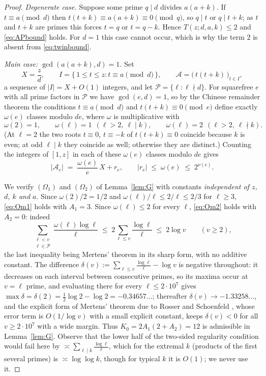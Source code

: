 \documentclass[10pt]{article}
\theoremstyle{definition}
\theoremstyle{remark}
\begin{document}
\begin{proof}
\emph{Degenerate case.} Suppose some prime $q \mid d$ divides $a(a+k)$. If
$t \equiv a \pmod d$ then $t(t+k) \equiv a(a+k) \equiv 0 \pmod q$, so $q \mid
t$ or $q \mid t+k$; as $t$ and $t+k$ are primes this forces $t = q$ or
$t = q-k$. Hence $T(z;d,a,k) \le 2$ and \eqref{eq:APbound} holds. For $d = 1$
this case cannot occur, which is why the term $2$ is absent from
\eqref{eq:twinbound}.

\emph{Main case: $\gcd(a(a+k), d) = 1$.} Set
\[
  X = \frac{z}{d}, \qquad
  I = \{\, 1 \le t \le z : t \equiv a \!\!\pmod d \,\}, \qquad
  \mathcal{A} = \bigl(\, t(t+k) \,\bigr)_{t \in I},
\]
a sequence of $|I| = X + O(1)$ integers, and let
$\mathcal{P} = \{\ell : \ell \nmid d\}$. For squarefree $e$ with all prime
factors in $\mathcal{P}$ we have $\gcd(e,d) = 1$, so by the Chinese remainder
theorem the conditions $t \equiv a \pmod d$ and $t(t+k) \equiv 0 \pmod e$
define exactly $\omega(e)$ classes modulo $de$, where $\omega$ is
multiplicative with
\[
  \omega(2) = 1, \qquad
  \omega(\ell) = 1 \ \ (\ell > 2,\ \ell \mid k), \qquad
  \omega(\ell) = 2 \ \ (\ell > 2,\ \ell \nmid k).
\]
(At $\ell = 2$ the two roots $t \equiv 0$, $t \equiv -k$ of $t(t+k) \equiv 0$
coincide because $k$ is even; at odd $\ell \mid k$ they coincide as well;
otherwise they are distinct.) Counting the integers of $[1,z]$ in each of
these $\omega(e)$ classes modulo $de$ gives
\[
  |\mathcal{A}_e| \;=\; \frac{\omega(e)}{e}\,X + r_e,
  \qquad |r_e| \;\le\; \omega(e) \;\le\; 2^{\nu(e)} .
\]

We verify $(\Omega_1)$ and $(\Omega_2)$ of Lemma~\ref{lem:G} with constants
\emph{independent of $z$, $d$, $k$ and $a$}. Since $\omega(2)/2 = 1/2$ and
$\omega(\ell)/\ell \le 2/\ell \le 2/3$ for $\ell \ge 3$, \eqref{eq:Om1} holds
with $A_1 = 3$. Since $\omega(\ell) \le 2$ for every $\ell$, \eqref{eq:Om2}
holds with $A_2 = 0$: indeed
\[
  \sum_{\substack{\ell < v \\ \ell \in \mathcal{P}}}
    \frac{\omega(\ell)\log\ell}{\ell}
  \;\le\; 2\sum_{\ell \le v}\frac{\log\ell}{\ell}
  \;\le\; 2\log v \qquad (v \ge 2),
\]
the last inequality being Mertens' theorem in its sharp form, with no additive
constant. The difference $\delta(v) := \sum_{\ell\le v}\frac{\log\ell}{\ell} -
\log v$ is negative throughout: it decreases on each interval between
consecutive primes, so its maxima occur at $v = \ell$ prime, and evaluating
there for every $\ell \le 2\cdot10^{7}$ gives $\max\delta = \delta(2) =
\tfrac12\log 2 - \log 2 = -0.34657\ldots$; thereafter $\delta(v) \to
-1.33258\ldots$, and the explicit form of Mertens' theorem due to Rosser and
Schoenfeld \cite{RS}, whose error term is $O(1/\log v)$ with a small explicit
constant, keeps $\delta(v) < 0$ for all $v \ge 2\cdot10^{7}$ with a wide
margin. Thus $K_0 = 2A_1(2+A_2) = 12$ is admissible in
Lemma~\ref{lem:G}. Observe that the lower half of the two-sided regularity
condition would fail here by $\asymp \sum_{\ell \mid k}\frac{\log \ell}{\ell}$,
which for the extremal $k$ (products of the first several primes) is
$\asymp \log\log k$, though for typical $k$ it is $O(1)$; we never use it.


\end{proof}
\end{document}
